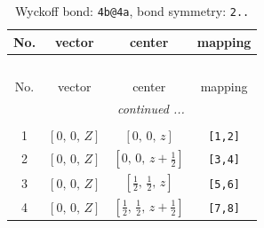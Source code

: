\documentclass[fleqn,8pt]{jsarticle}
\begin{document}
\begin{longtable}{cccc}
\caption{Wyckoff bond: {\tt 4b@4a}, bond symmetry: {\tt 2..}}
 \\
 \hline \hline
No. & vector & center & mapping \\ \hline \endfirsthead

\multicolumn{3}{l}{\tablename\ \thetable{}} \\
 \hline \hline
No. & vector & center & mapping \\ \hline \endhead

 \hline \hline
\multicolumn{3}{r}{\footnotesize\it continued ...} \\ \endfoot

 \hline \hline
\multicolumn{3}{r}{} \\ \endlastfoot

1 & $\left[ 0,\, 0,\, Z \right]$ & $\left[ 0,\, 0,\, z \right]$ & {\tt [1,2]} \\ \hline
2 & $\left[ 0,\, 0,\, Z \right]$ & $\left[ 0,\, 0,\, z + \frac{1}{2} \right]$ & {\tt [3,4]} \\ \hline
3 & $\left[ 0,\, 0,\, Z \right]$ & $\left[ \frac{1}{2},\, \frac{1}{2},\, z \right]$ & {\tt [5,6]} \\ \hline
4 & $\left[ 0,\, 0,\, Z \right]$ & $\left[ \frac{1}{2},\, \frac{1}{2},\, z + \frac{1}{2} \right]$ & {\tt [7,8]} \\
\end{longtable}
\renewcommand{\arraystretch}{1.2}
\end{document}
